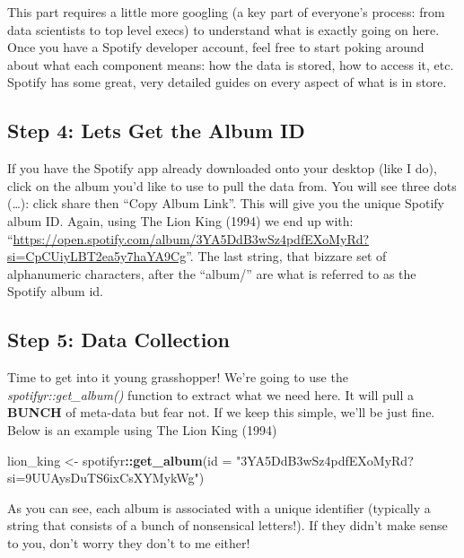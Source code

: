 \documentclass[
]{article}
\newenvironment{Shaded}{\begin{snugshade}}{\end{snugshade}}
\newcommand{\DataTypeTok}[1]{\textcolor[rgb]{0.13,0.29,0.53}{#1}}
\newcommand{\KeywordTok}[1]{\textcolor[rgb]{0.13,0.29,0.53}{\textbf{#1}}}
\newcommand{\NormalTok}[1]{#1}
\newcommand{\OperatorTok}[1]{\textcolor[rgb]{0.81,0.36,0.00}{\textbf{#1}}}
\newcommand{\StringTok}[1]{\textcolor[rgb]{0.31,0.60,0.02}{#1}}
\begin{document}
This part requires a little more googling (a key part of everyone's
process: from data scientists to top level execs) to understand what is
exactly going on here. Once you have a Spotify developer account, feel
free to start poking around about what each component means: how the
data is stored, how to access it, etc. Spotify has some great, very
detailed guides on every aspect of what is in store.

\hypertarget{step-4-lets-get-the-album-id}{%
\subsection{Step 4: Lets Get the Album
ID}\label{step-4-lets-get-the-album-id}}

If you have the Spotify app already downloaded onto your desktop (like I
do), click on the album you'd like to use to pull the data from. You
will see three dots (\ldots): click share then ``Copy Album Link''. This
will give you the unique Spotify album ID. Again, using The Lion King
(1994) we end up with:
``\url{https://open.spotify.com/album/3YA5DdB3wSz4pdfEXoMyRd?si=CpCUiyLBT2ea5y7haYA9Cg}''.
The last string, that bizzare set of alphanumeric characters, after the
``album/'' are what is referred to as the Spotify album id.

\hypertarget{step-5-data-collection}{%
\subsection{Step 5: Data Collection}\label{step-5-data-collection}}

Time to get into it young grasshopper! We're going to use the
\emph{spotifyr::get\_album()} function to extract what we need here. It
will pull a \textbf{BUNCH} of meta-data but fear not. If we keep this
simple, we'll be just fine. Below is an example using The Lion King
(1994)

\begin{Shaded}
\begin{Highlighting}[]
\NormalTok{lion_king <-}\StringTok{ }\NormalTok{spotifyr}\OperatorTok{::}\KeywordTok{get_album}\NormalTok{(}\DataTypeTok{id =} \StringTok{"3YA5DdB3wSz4pdfEXoMyRd?si=9UUAysDuTS6ixCsXYMykWg"}\NormalTok{)}
\end{Highlighting}
\end{Shaded}

As you can see, each album is associated with a unique identifier
(typically a string that consists of a bunch of nonsensical letters!).
If they didn't make sense to you, don't worry they don't to me either!
\end{document}
